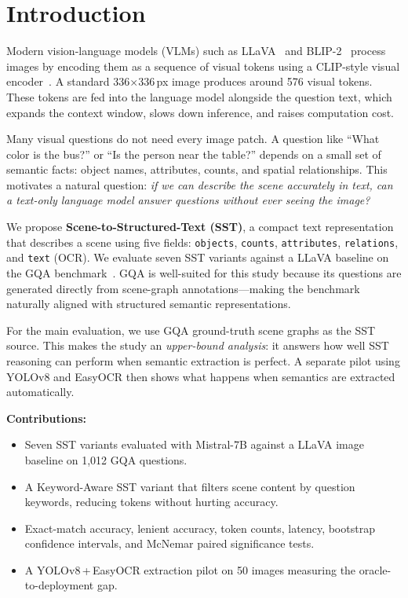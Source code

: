 \documentclass[10pt,twocolumn]{article}
\begin{document}
\smallskip
{}

\vspace{8pt}
\section{Introduction}

Modern vision-language models (VLMs) such as LLaVA~\cite{liu2023llava} and BLIP-2~\cite{li2023blip2} process images by encoding them as a sequence of visual tokens using a CLIP-style visual encoder~\cite{radford2021clip}. A standard 336$\times$336\,px image produces around 576 visual tokens. These tokens are fed into the language model alongside the question text, which expands the context window, slows down inference, and raises computation cost.

Many visual questions do not need every image patch. A question like ``What color is the bus?'' or ``Is the person near the table?'' depends on a small set of semantic facts: object names, attributes, counts, and spatial relationships. This motivates a natural question: \textit{if we can describe the scene accurately in text, can a text-only language model answer questions without ever seeing the image?}

We propose \textbf{Scene-to-Structured-Text (SST)}, a compact text representation that describes a scene using five fields: \texttt{objects}, \texttt{counts}, \texttt{attributes}, \texttt{relations}, and \texttt{text} (OCR). We evaluate seven SST variants against a LLaVA baseline on the GQA benchmark~\cite{hudson2019gqa}. GQA is well-suited for this study because its questions are generated directly from scene-graph annotations---making the benchmark naturally aligned with structured semantic representations.

For the main evaluation, we use GQA ground-truth scene graphs as the SST source. This makes the study an \textit{upper-bound analysis}: it answers how well SST reasoning can perform when semantic extraction is perfect. A separate pilot using YOLOv8 and EasyOCR then shows what happens when semantics are extracted automatically.

\noindent\textbf{Contributions:}
\begin{itemize}
  \item Seven SST variants evaluated with Mistral-7B against a LLaVA image baseline on 1,012 GQA questions.
  \item A Keyword-Aware SST variant that filters scene content by question keywords, reducing tokens without hurting accuracy.
  \item Exact-match accuracy, lenient accuracy, token counts, latency, bootstrap confidence intervals, and McNemar paired significance tests.
  \item A YOLOv8\,+\,EasyOCR extraction pilot on 50 images measuring the oracle-to-deployment gap.
\end{itemize}
\end{document}
